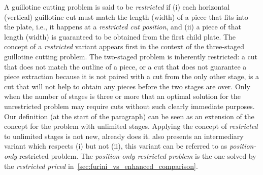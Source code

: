 \documentclass[ppgc,tese,english,formais,babel]{iiufrgs}
\begin{document}
A guillotine cutting problem is said to be \emph{restricted} if (i) each horizontal (vertical) guillotine cut must match the length (width) of a piece that fits into the plate, i.e., it happens at a \emph{restricted cut position}, and (ii) a piece of that length (width) is guaranteed to be obtained from the first child plate.
The concept of a \emph{restricted} variant appears first in the context of the three-staged guillotine cutting problem.
The two-staged problem is inherently restricted: a cut that does not match the outline of a piece, or a cut that does not guarantee a piece extraction because it is not paired with a cut from the only other stage, is a cut that will not help to obtain any pieces before the two stages are over.
Only when the number of stages is three or more that an optimal solution for the unrestricted problem may require cuts without such clearly immediate purposes.
Our definition (at the start of the paragraph) can be seen as an extension of the concept for the problem with unlimited stages.
Applying the concept of \emph{restricted} to unlimited stages is not new, \citet{furini:2016} already does it. \citet{furini:2016} also presents an intermediary variant which respects (i) but not (ii), this variant can be referred to as \emph{position-only} restricted problem.
The \emph{position-only restricted problem} is the one solved by the \emph{restricted priced} in~\cref{sec:furini_vs_enhanced_comparison}.
\end{document}
